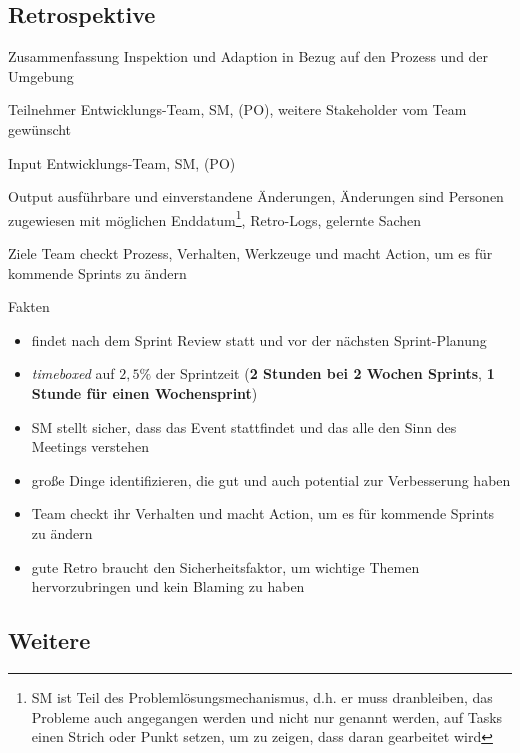 \subsection{Retrospektive}
\begin{Beschreibungfett}[Zusammenfassung]
  \item [Zusammenfassung] Inspektion und Adaption in Bezug auf den Prozess und der Umgebung
  \item [Teilnehmer] Entwicklungs-Team, SM, (PO), weitere Stakeholder vom Team gewünscht
  \item [Input] Entwicklungs-Team, SM, (PO)
  \item [Output] ausführbare und einverstandene Änderungen, Änderungen sind Personen zugewiesen mit
    möglichen Enddatum\footnote{SM ist Teil des Problemlösungsmechanismus, d.h. er muss
      dranbleiben, das Probleme auch angegangen werden und nicht nur genannt werden, auf
      Tasks einen Strich oder Punkt setzen, um zu zeigen, dass daran gearbeitet wird}, Retro-Logs, gelernte Sachen
  \item [Ziele] Team checkt Prozess, Verhalten, Werkzeuge und macht Action, um es für kommende Sprints zu ändern
  \item [Fakten]
    \begin{itemize}
      \item findet nach dem Sprint Review statt und vor der nächsten Sprint-Planung
      \item \textit{timeboxed} auf $2,5\%$ der Sprintzeit (\textbf{2 Stunden bei 2 Wochen Sprints}, \textbf{1 Stunde für einen Wochensprint})
      \item SM stellt sicher, dass das Event stattfindet und das alle den Sinn des Meetings
        verstehen
      \item große Dinge identifizieren, die gut und auch potential zur Verbesserung haben
      \item Team checkt ihr Verhalten und macht Action, um es für kommende Sprints zu ändern
      \item gute Retro braucht den Sicherheitsfaktor, um wichtige Themen hervorzubringen und kein
        Blaming zu haben
    \end{itemize}
\end{Beschreibungfett}


\subsection{Weitere}

